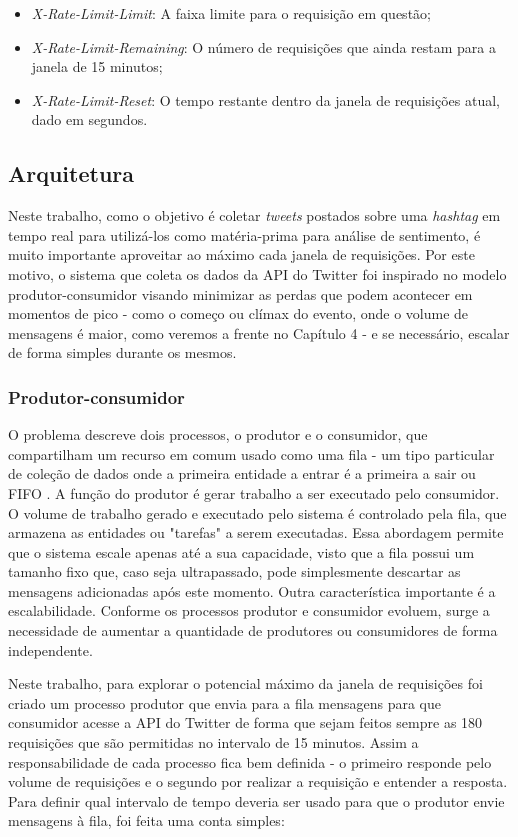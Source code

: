 \begin{itemize}
	\item \textit{X-Rate-Limit-Limit}: A faixa limite para o requisição em questão;
	\item \textit{X-Rate-Limit-Remaining}: O número de requisições que ainda restam para a janela de 15 minutos;
	\item \textit{X-Rate-Limit-Reset}: O tempo restante dentro da janela de requisições atual, dado em segundos.
\end{itemize}

\subsection{Arquitetura}

Neste trabalho, como o objetivo é coletar \textit{tweets} postados sobre uma \textit{hashtag} em tempo real para utilizá-los como matéria-prima para análise de sentimento, é muito importante aproveitar ao máximo cada janela de requisições. Por este motivo, o sistema que coleta os dados da API do Twitter foi inspirado no modelo produtor-consumidor\cite{jeffay1993real} visando minimizar as perdas que podem acontecer em momentos de pico - como o começo ou clímax do evento, onde o volume de mensagens é maior, como veremos a frente no Capítulo 4 - e se necessário, escalar de forma simples durante os mesmos. 

\subsubsection{Produtor-consumidor}

O problema descreve dois processos, o produtor e o consumidor, que compartilham um recurso em comum usado como uma fila - um tipo particular de coleção de dados onde a primeira entidade a entrar é a primeira a sair ou \ac{FIFO} . A função do produtor é gerar trabalho a ser executado pelo consumidor. O volume de trabalho gerado e executado pelo sistema é controlado pela fila, que armazena as entidades ou "tarefas" a serem executadas. Essa abordagem permite que o sistema escale apenas até a sua capacidade, visto que a fila possui um tamanho fixo que, caso seja ultrapassado, pode simplesmente descartar as mensagens adicionadas após este momento. Outra característica importante é a escalabilidade. Conforme os processos produtor e consumidor evoluem, surge a necessidade de aumentar a quantidade de produtores ou consumidores de forma independente.

Neste trabalho, para explorar o potencial máximo da janela de requisições foi criado um processo produtor que envia para a fila mensagens para que consumidor acesse a API do Twitter de forma que sejam feitos sempre as 180 requisições que são permitidas no intervalo de 15 minutos. Assim a responsabilidade de cada processo fica bem definida - o primeiro responde pelo volume de requisições e o segundo por realizar a requisição e entender a resposta. Para definir qual intervalo de tempo deveria ser usado para que o produtor envie mensagens à fila, foi feita uma conta simples:

